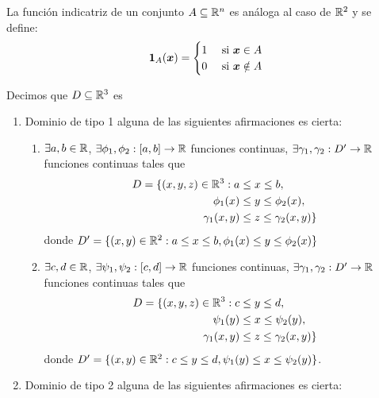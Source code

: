 \begin{definicion}
La funci\'on indicatriz de un conjunto $A\subseteq \mathbb{R}^n$ es an\'aloga al caso de $\mathbb{R}^2$ y se define:
\[
    \mathbf{1}_{A}(\boldsymbol{x}) = \begin{cases}
        1	 & \text{ si } \boldsymbol{x} \in A \\
        0    & \text{ si } \boldsymbol{x} \notin A
    \end{cases}
\]
\end{definicion}

\begin{definicion}
Decimos que $ D \subseteq \mathbb{R}^3 $ es
\begin{enumerate}
    \item Dominio de tipo 1 \tssi{} alguna de las siguientes afirmaciones
    es cierta:
    \begin{enumerate}
        \item $\exists a,b \in \mathbb{R}$, $\exists \phi_1, \phi_2:[a,b] \to
\mathbb{R} $ funciones continuas, $\exists \gamma_1, \gamma_2:D' \to \mathbb{R}
$ funciones continuas tales que
\begin{align*}
    D = \{(x,y,z) \in \mathbb{R}^3 : a &\leq x \leq b, \\
    \phi_1(x) &\leq y \leq \phi_2(x), \\
    \gamma_1(x,y) &\leq z \leq \gamma_2(x,y)\}
\end{align*}
donde $ D' = \{(x,y) \in \mathbb{R}^2: a \leq x \leq b, \phi_1(x) \leq y
\leq \phi_2(x) \} $
        \item $\exists c,d \in \mathbb{R}$, $\exists \psi_1, \psi_2:[c,d] \to
\mathbb{R} $ funciones continuas, $\exists \gamma_1, \gamma_2:D' \to \mathbb{R}
$ funciones continuas tales que
\begin{align*}
    D = \{(x,y,z) \in \mathbb{R}^3 : c &\leq y \leq d, \\
    \psi_1(y) &\leq x \leq \psi_2(y), \\
    \gamma_1(x,y) &\leq z \leq \gamma_2(x,y)\}
\end{align*}
donde $ D' = \{(x,y) \in \mathbb{R}^2: c \leq y \leq d, \psi_1(y) \leq x
\leq \psi_2(y) \} $.
    \end{enumerate}
    \item Dominio de tipo 2 \tssi{} alguna de las siguientes afirmaciones
    es cierta:
\end{enumerate}
\end{definicion}
